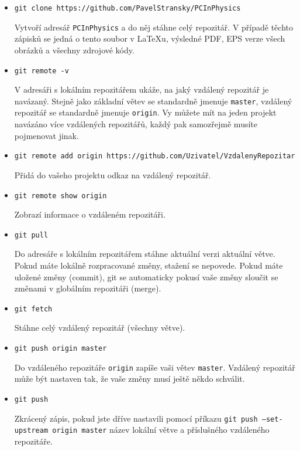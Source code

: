 \documentclass[a4paper,11pt,twoside]{article}
\def\code#1{\textnormal{\texttt{#1}}}
\begin{document}
        \begin{itemize}
        \item \code{git clone https://github.com/PavelStransky/PCInPhysics}
        
            Vytvoří adresář \code{PCInPhysics} a do něj stáhne celý repozitář.
            V případě těchto zápisků se jedná o tento soubor v {\LaTeX}u,
            výsledné PDF, EPS verze všech obrázků a všechny zdrojové kódy.

        \item \code{git remote -v}
        
            V adresáři s lokálním repozitářem ukáže, na jaký vzdálený repozitář je navázaný.
            Stejně jako základní větev se standardně jmenuje \code{master}, vzdálený repozitář se standardně jmenuje \code{origin}.
            Vy můžete mít na jeden projekt navázáno více vzdálených repozitářů, každý pak samozřejmě musíte pojmenovat jinak.

        \item \code{git remote add origin https://github.com/Uzivatel/VzdalenyRepozitar}
        
            Přidá do vašeho projektu odkaz na vzdálený repozitář.

        \item \code{git remote show origin}
        
            Zobrazí informace o vzdáleném repozitáři.

        \item \code{git pull}
        
            Do adresáře s lokálním repozitářem stáhne aktuální verzi aktuální větve.
            Pokud máte lokálně rozpracované změny, stažení se nepovede.
            Pokud máte uložené změny (commit), git se automaticky pokusí vaše změny sloučit se změnami v globálním repozitáři (merge).
            
        \item \code{git fetch}
        
            Stáhne celý vzdálený repozitář (všechny větve).
        
        \item \code{git push origin master}
        
            Do vzdáleného repozitáře \code{origin} zapíše vaši větev \code{master}.
            Vzdálený repozitář může být nastaven tak, že vaše změny musí ještě někdo schválit.

        \item \code{git push}
    
            Zkrácený zápis, pokud jste dříve nastavili pomocí příkazu \code{git push --set-upstream origin master} název lokální větve a příslušného vzdáleného repozitáře.

        \end{itemize}
\end{document}
